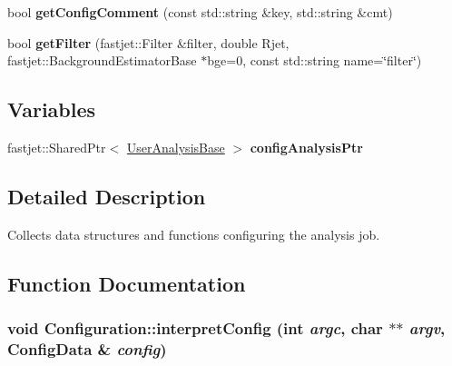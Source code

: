 \begin{CompactItemize}
\item 
\hypertarget{namespaceConfiguration_474c462cac1b9fc3dfede75058ee88db}{
bool \textbf{get\-Config\-Comment} (const std::string \&key, std::string \&cmt)}
\label{namespaceConfiguration_474c462cac1b9fc3dfede75058ee88db}

\item 
\hypertarget{namespaceConfiguration_54720a0510074ea2252586b41c5932d8}{
bool \textbf{get\-Filter} (fastjet::Filter \&filter, double Rjet, fastjet::Background\-Estimator\-Base $\ast$bge=0, const std::string name=\char`\"{}filter\char`\"{})}
\label{namespaceConfiguration_54720a0510074ea2252586b41c5932d8}

\end{CompactItemize}
\subsection*{Variables}
\begin{CompactItemize}
\item 
\hypertarget{namespaceConfiguration_66185a2e6698bc6277255f4513de564b}{
fastjet::Shared\-Ptr$<$ \hyperlink{classUserAnalysisBase}{User\-Analysis\-Base} $>$ \textbf{config\-Analysis\-Ptr}}
\label{namespaceConfiguration_66185a2e6698bc6277255f4513de564b}

\end{CompactItemize}


\subsection{Detailed Description}
Collects data structures and functions configuring the analysis job. 



\subsection{Function Documentation}
\hypertarget{namespaceConfiguration_abb30e1934601532c3fee5dc06c9e2f8}{
\subsubsection[interpretConfig]{\setlength{\rightskip}{0pt plus 5cm}void Configuration::interpret\-Config (int {\em argc}, char $\ast$$\ast$ {\em argv}, Config\-Data \& {\em config})}}
\label{namespaceConfiguration_abb30e1934601532c3fee5dc06c9e2f8}


